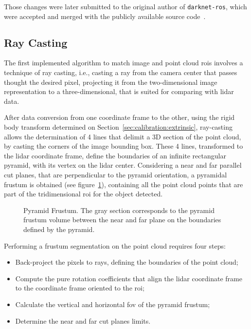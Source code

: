 Those changes were later submitted to the original author of \texttt{darknet-ros}, which were accepted and merged with the publicly available source code~\cite{MarkoBjelonic}.


\subsection{Ray Casting}
\label{subsec:object-detection:ray-casting}
The first implemented algorithm to match image and point cloud \acp{roi} involves a technique of ray casting, i.e., casting a ray from the camera center that passes thought the desired pixel, projecting it from the two-dimensional image representation to a three-dimensional, that is suited for comparing with \ac{lidar} data.

After data conversion from one coordinate frame to the other, using the rigid body transform determined on Section~\ref{sec:calibration:extrinsic}, ray-casting allows the determination of 4 lines that delimit a 3D section of the point cloud, by casting the corners of the image bounding box. These 4 lines, transformed to the \ac{lidar} coordinate frame, define the boundaries of an infinite rectangular pyramid, with its vertex on the \ac{lidar} center. Considering a near and far parallel cut planes, that are perpendicular to the pyramid orientation, a pyramidal frustum is obtained (see figure~\ref{fig:pyramid-frustum}), containing all the point cloud points that are part of the tridimensional \ac{roi} for the object detected.  

\begin{figure}[H]
	\centering
	\def\svgwidth{0.3\columnwidth}
	\graphicspath{{img/image-object-to-point-cloud/}}
	
	\caption{Pyramid Frustum. The gray section corresponds to the pyramid frustum volume between the near and far plane on the boundaries defined by the pyramid.}
	\label{fig:pyramid-frustum}
\end{figure}

Performing a frustum segmentation on the point cloud requires four steps:

\begin{itemize}
	\item Back-project the pixels to rays, defining the boundaries of the point cloud;
	\item Compute the pure rotation coefficients that align the \ac{lidar} coordinate frame to the coordinate frame oriented to the \ac{roi};
	\item Calculate the vertical and horizontal \acf{fov} of the pyramid frustum;
	\item Determine the near and far cut planes limits.
\end{itemize}


